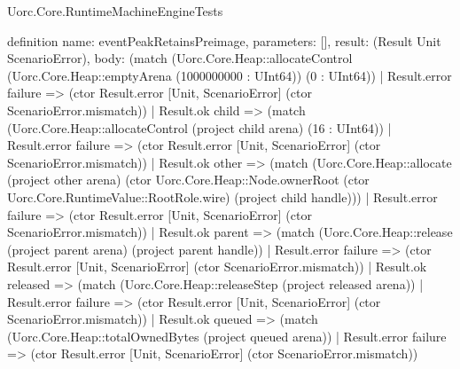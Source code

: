 \begin{lexlean}{Uorc.Core.RuntimeMachineEngineTests}
\begin{semanticmodule}
definition{
  name: eventPeakRetainsPreimage,
  parameters: [],
  result: (Result Unit ScenarioError),
  body: (match (Uorc.Core.Heap::allocateControl (Uorc.Core.Heap::emptyArena (1000000000 : UInt64)) (0 : UInt64))
    | Result.error failure => (ctor Result.error [Unit, ScenarioError] (ctor ScenarioError.mismatch))
    | Result.ok child => (match (Uorc.Core.Heap::allocateControl (project child arena) (16 : UInt64))
      | Result.error failure => (ctor Result.error [Unit, ScenarioError] (ctor ScenarioError.mismatch))
      | Result.ok other => (match (Uorc.Core.Heap::allocate (project other arena) (ctor Uorc.Core.Heap::Node.ownerRoot (ctor Uorc.Core.RuntimeValue::RootRole.wire) (project child handle)))
        | Result.error failure => (ctor Result.error [Unit, ScenarioError] (ctor ScenarioError.mismatch))
        | Result.ok parent => (match (Uorc.Core.Heap::release (project parent arena) (project parent handle))
          | Result.error failure => (ctor Result.error [Unit, ScenarioError] (ctor ScenarioError.mismatch))
          | Result.ok released => (match (Uorc.Core.Heap::releaseStep (project released arena))
            | Result.error failure => (ctor Result.error [Unit, ScenarioError] (ctor ScenarioError.mismatch))
            | Result.ok queued => (match (Uorc.Core.Heap::totalOwnedBytes (project queued arena))
              | Result.error failure => (ctor Result.error [Unit, ScenarioError] (ctor ScenarioError.mismatch))
}
\end{semanticmodule}
\end{lexlean}
